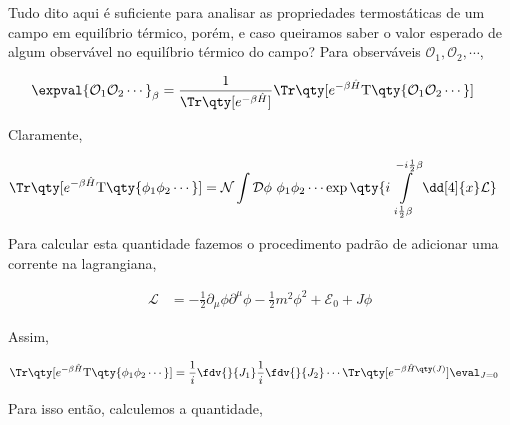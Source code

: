 \documentclass[twoside]{amsart}
\numberwithin{equation}{section}
\newcommand{\Dd}[1]{\mathcal D #1}
\begin{document}
\begin{refsection}
Tudo dito aqui é suficiente para analisar as propriedades termostáticas de um campo em equilíbrio térmico, porém, e caso queiramos saber o valor esperado de algum observável no equilíbrio térmico do campo? Para observáveis $\mathcal O_1,\mathcal O_2,\cdots$,

\begin{align}
    \expval{\mathcal O_1\mathcal O_2\cdots}_\beta&=\frac1{\Tr\qty[e^{-\beta\hat H}]}\Tr\qty[e^{-\beta\hat H}\textup{T}\qty{\mathcal O_1\mathcal O_2\cdots}]
\end{align}

Claramente,

\begin{align}
    \Tr\qty[e^{-\beta\hat H}\textup{T}\qty{\phi_1\phi_2\cdots}]&=\mathcal N\int\Dd{\phi}\ \phi _1\phi_2\cdots \exp\qty{i\int\limits_{i\frac12\beta}^{-i\frac12\beta}\dd[4]{x}\mathcal L}
\end{align}

Para calcular esta quantidade fazemos o procedimento padrão de adicionar uma corrente na lagrangiana,

\begin{align}
    \mathcal L&=-\frac12\partial_\mu\phi\partial^\mu\phi-\frac12m^2\phi^2+\mathcal E_0+J\phi
\end{align}

Assim,

\begin{align}
    \Tr\qty[e^{-\beta\hat H}\textup{T}\qty{\phi_1\phi_2\cdots}]&=\frac1i\fdv{}{J_1}\frac1i\fdv{}{J_2}\cdots\Tr\qty[e^{-\beta\hat H\qty(J)}]\eval_{J=0}
\end{align}

Para isso então, calculemos a quantidade,


\end{refsection}
\end{document}
